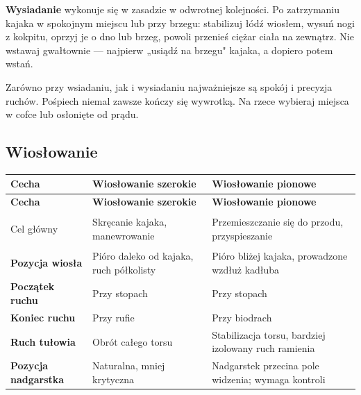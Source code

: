 \textbf{Wysiadanie} wykonuje się w zasadzie w odwrotnej kolejności. Po zatrzymaniu kajaka w spokojnym miejscu lub przy brzegu: stabilizuj łódź wiosłem, wysuń nogi z kokpitu, oprzyj je o dno lub brzeg, powoli przenieś ciężar ciała na zewnątrz. Nie wstawaj gwałtownie — najpierw „usiądź na brzegu" kajaka, a dopiero potem wstań.

\begin{tipbox}
  Zarówno przy wsiadaniu, jak i wysiadaniu najważniejsze są spokój i precyzja ruchów. Pośpiech niemal zawsze kończy się wywrotką. Na rzece wybieraj miejsca w cofce lub osłonięte od prądu.
\end{tipbox}

\subsection{Wiosłowanie}

\begin{longtable}{>{\bfseries}p{4.2cm} p{4.9cm} p{4.9cm}}
  \toprule
  \textbf{Cecha} & \textbf{Wiosłowanie szerokie} & \textbf{Wiosłowanie pionowe} \\
  \midrule
  \endfirsthead
  \toprule
  \textbf{Cecha} & \textbf{Wiosłowanie szerokie} & \textbf{Wiosłowanie pionowe} \\
  \midrule
  \endhead
  \bottomrule
  \endfoot

  Cel główny
    & Skręcanie kajaka, manewrowanie
    & Przemieszczanie się do przodu, przyspieszanie \\

  Pozycja wiosła
    & Pióro daleko od kajaka, ruch półkolisty
    & Pióro bliżej kajaka, prowadzone wzdłuż kadłuba \\

  Początek ruchu
    & Przy stopach
    & Przy stopach \\

  Koniec ruchu
    & Przy rufie
    & Przy biodrach \\

  Ruch tułowia
    & Obrót całego torsu
    & Stabilizacja torsu, bardziej izolowany ruch ramienia \\

  Pozycja nadgarstka
    & Naturalna, mniej krytyczna
    & Nadgarstek przecina pole widzenia; wymaga kontroli \\
\end{longtable}

